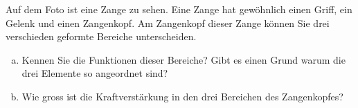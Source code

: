 
\begin{center}
\end{center}

\begin{aufgabe}
	Auf dem Foto ist eine Zange zu sehen.%
	Eine Zange hat gewöhnlich einen Griff, ein Gelenk und einen Zangenkopf.
	Am Zangenkopf dieser Zange können Sie drei verschieden geformte Bereiche unterscheiden.
	\begin{enumerate} [a)]
		\item Kennen Sie die Funktionen dieser Bereiche? Gibt es einen Grund warum die drei Elemente so angeordnet sind?
		\item Wie gross ist die Kraftverstärkung in den drei Bereichen des Zangenkopfes?
	\end{enumerate}
\end{aufgabe}
